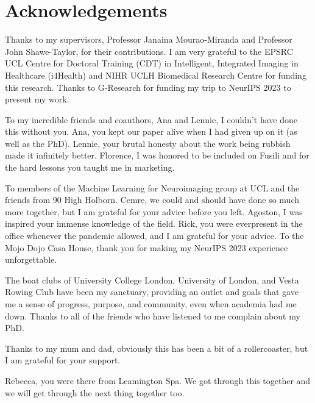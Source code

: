 \chapter*{Acknowledgements}

Thanks to my supervisors, Professor Janaina Mourao-Miranda and Professor John Shawe-Taylor, for their contributions. 
I am very grateful to the EPSRC UCL Centre for Doctoral Training (CDT) in Intelligent, Integrated Imaging in Healthcare (i4Health) and NIHR UCLH Biomedical
Research Centre for funding this research.
Thanks to G-Research for funding my trip to NeurIPS 2023 to present my work.

To my incredible friends and coauthors, Ana and Lennie, I couldn't have done this without you. Ana, you kept our paper alive when I had given up on it (as well as the PhD). Lennie, your brutal honesty about the work being rubbish made it infinitely better. Florence, I was honored to be included on Fusili and for the hard lessons you taught me in marketing.

To members of the Machine Learning for Neuroimaging group at UCL and the friends from 90 High Holborn.
Cemre, we could and should have done so much more together, but I am grateful for your advice before you left. 
Agoston, I was inspired your immense knowledge of the field.
Rick, you were everpresent in the office whenever the pandemic allowed, and I am grateful for your advice.
To the Mojo Dojo Casa House, thank you for making my NeurIPS 2023 experience unforgettable.

The boat clubs of University College London, University of London, and Vesta Rowing Club have been my sanctuary, providing an outlet and goals that gave me a sense of progress, purpose, and community, even when academia had me down. Thanks to all of the friends who have listened to me complain about my PhD.

Thanks to my mum and dad, obviously this has been a bit of a rollercoaster, but I am grateful for your support.

Rebecca, you were there from Leamington Spa. We got through this together and we will get through the next thing together too.

